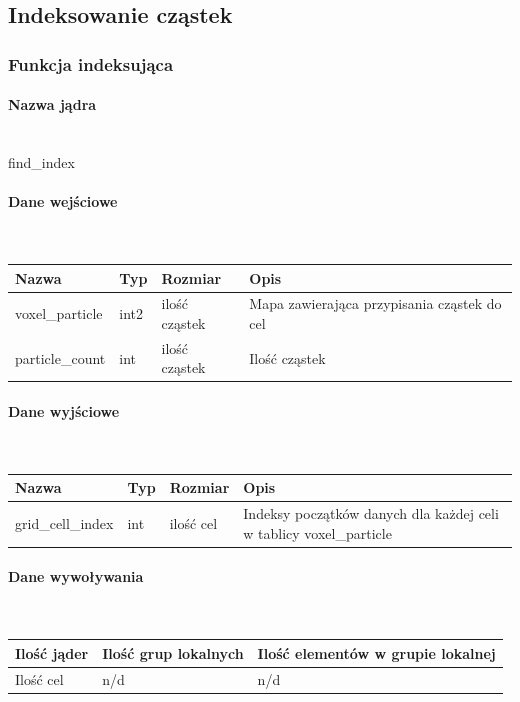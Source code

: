 \documentclass[polish, 12pt]{aghthesis}
\begin{document}
		\subsection{Indeksowanie cząstek}
			\subsubsection{Funkcja indeksująca}
				\paragraph{Nazwa jądra} \ \\
					find\_index
				\paragraph{Dane wejściowe} \ \\
					\begin{tabular}{| p{} | p{} | p{} | p{} |}
					\hline
						Nazwa & Typ & Rozmiar & Opis \\
					\hline
						voxel\_particle & int2 & ilość cząstek & Mapa zawierająca przypisania cząstek do cel \\ 
					\hline
						particle\_count & int & ilość cząstek & Ilość cząstek \\
					\hline
					\end{tabular}
				\paragraph{Dane wyjściowe} \ \\
					\begin{tabular}{| p{} | p{} | p{} | p{} |}
					\hline
						Nazwa & Typ & Rozmiar & Opis \\
					\hline
						grid\_cell\_index & int & ilość cel & Indeksy początków danych dla każdej celi w tablicy voxel\_particle \\
					\hline
				\end{tabular}
				\paragraph{Dane wywoływania} \ \\
					\begin{tabular}{| p{} | p{} | p{}|}
					\hline
						Ilość jąder & Ilość grup lokalnych & Ilość elementów w grupie lokalnej \\
					\hline
						Ilość cel & n/d & n/d \\ 
					\hline
					\end{tabular}
\end{document}
